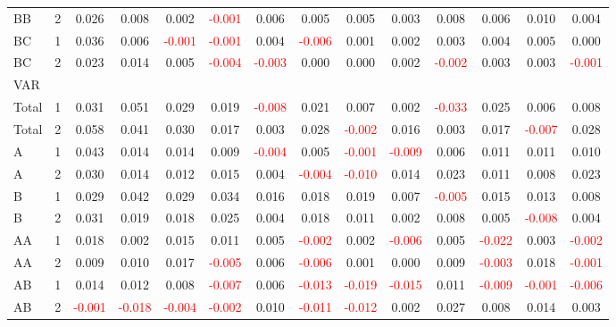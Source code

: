 \begin{table}[H]
{\begin{tabular}{llcccccccccccc}
BB & 2 & 0.026 & 0.008 & 0.002 & \textcolor{red}{-0.001} & 0.006 & 0.005 & 0.005 & 0.003 & 0.008 & 0.006 & 0.010 & 0.004\\
BC & 1 & 0.036 & 0.006 & \textcolor{red}{-0.001} & \textcolor{red}{-0.001} & 0.004 & \textcolor{red}{-0.006} & 0.001 & 0.002 & 0.003 & 0.004 & 0.005 & 0.000\\
BC & 2 & 0.023 & 0.014 & 0.005 & \textcolor{red}{-0.004} & \textcolor{red}{-0.003} & 0.000 & 0.000 & 0.002 & \textcolor{red}{-0.002} & 0.003 & 0.003 & \textcolor{red}{-0.001}\\
\hline
VAR &  &  &  &  &  &  &  &  &  &  &  &  & \\
\hline
Total & 1 & 0.031 & 0.051 & 0.029 & 0.019 & \textcolor{red}{-0.008} & 0.021 & 0.007 & 0.002 & \textcolor{red}{-0.033} & 0.025 & 0.006 & 0.008\\
Total & 2 & 0.058 & 0.041 & 0.030 & 0.017 & 0.003 & 0.028 & \textcolor{red}{-0.002} & 0.016 & 0.003 & 0.017 & \textcolor{red}{-0.007} & 0.028\\
A & 1 & 0.043 & 0.014 & 0.014 & 0.009 & \textcolor{red}{-0.004} & 0.005 & \textcolor{red}{-0.001} & \textcolor{red}{-0.009} & 0.006 & 0.011 & 0.011 & 0.010\\
A & 2 & 0.030 & 0.014 & 0.012 & 0.015 & 0.004 & \textcolor{red}{-0.004} & \textcolor{red}{-0.010} & 0.014 & 0.023 & 0.011 & 0.008 & 0.023\\
B & 1 & 0.029 & 0.042 & 0.029 & 0.034 & 0.016 & 0.018 & 0.019 & 0.007 & \textcolor{red}{-0.005} & 0.015 & 0.013 & 0.008\\
B & 2 & 0.031 & 0.019 & 0.018 & 0.025 & 0.004 & 0.018 & 0.011 & 0.002 & 0.008 & 0.005 & \textcolor{red}{-0.008} & 0.004\\
AA & 1 & 0.018 & 0.002 & 0.015 & 0.011 & 0.005 & \textcolor{red}{-0.002} & 0.002 & \textcolor{red}{-0.006} & 0.005 & \textcolor{red}{-0.022} & 0.003 & \textcolor{red}{-0.002}\\
AA & 2 & 0.009 & 0.010 & 0.017 & \textcolor{red}{-0.005} & 0.006 & \textcolor{red}{-0.006} & 0.001 & 0.000 & 0.009 & \textcolor{red}{-0.003} & 0.018 & \textcolor{red}{-0.001}\\
AB & 1 & 0.014 & 0.012 & 0.008 & \textcolor{red}{-0.007} & 0.006 & \textcolor{red}{-0.013} & \textcolor{red}{-0.019} & \textcolor{red}{-0.015} & 0.011 & \textcolor{red}{-0.009} & \textcolor{red}{-0.001} & \textcolor{red}{-0.006}\\
AB & 2 & \textcolor{red}{-0.001} & \textcolor{red}{-0.018} & \textcolor{red}{-0.004} & \textcolor{red}{-0.002} & 0.010 & \textcolor{red}{-0.011} & \textcolor{red}{-0.012} & 0.002 & 0.027 & 0.008 & 0.014 & 0.003\\

\end{tabular}}
\end{table}
